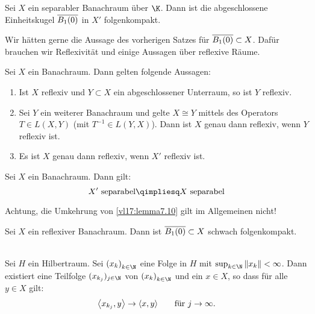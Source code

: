 \begin{thSatz} \label{vl17:satz7.8}
    Sei $X$ ein separabler Banachraum über $\K$. Dann ist die abgeschlossene
    Einheitskugel $\overline{B_1(0)}$ in $X'$ \schwachstern folgenkompakt.
\end{thSatz}


Wir hätten gerne die Aussage des vorherigen Satzes für
$\overline{B_1(0)}\subset X$. Dafür brauchen wir Reflexivität und
einige Aussagen über reflexive Räume.

\begin{thLemma} \label{vl17:lemma7.9}
    Sei $X$ ein Banachraum. Dann gelten folgende Aussagen:
    \begin{enumerate}[(1)]
        \item \label{vl17:lemma7.9:1}
            Ist $X$ reflexiv und $Y\subset X$ ein abgeschlossener Unterraum, so
            ist $Y$ reflexiv.
            
        \item \label{vl17:lemma7.9:2}
            Sei $Y$ ein weiterer Banachraum und gelte $X\cong Y$ mittels des
            Operators $T\in L(X,Y)$ (mit $T^{-1}\in L(Y,X)$). Dann ist $X$ genau
            dann reflexiv, wenn $Y$ reflexiv ist.
            
        \item \label{vl17:lemma7.9:3}
            Es ist $X$ genau dann reflexiv, wenn $X'$ reflexiv ist.
    \end{enumerate}
\end{thLemma}


\begin{thLemma} \label{vl17:lemma7.10}
    Sei $X$ ein Banachraum. Dann gilt:
    \[ X'\text{ separabel} \qimpliesq X\text{ separabel} \]
\end{thLemma}


Achtung, die Umkehrung von \cref{vl17:lemma7.10} gilt im Allgemeinen nicht!

\begin{thSatz} \label{vl17:satz7.11}
    Sei $X$ ein reflexiver Banachraum. Dann ist $\overline{B_1(0)}\subset X$
    schwach folgenkompakt.
\end{thSatz}


\begin{thEmpty}\hfill\\
    \nnSatz
    Sei $H$ ein Hilbertraum. Sei $\kSeq x$ eine Folge in $H$ mit
    $\sup_{k\in\N} \, \norm{x_k} < \infty$. Dann existiert eine Teilfolge
    $(x_{k_j})_{j\in\N}$ von $\kSeq x$ und ein $x\in X$, so dass für alle
    $y\in X$ gilt:
    \[ \SP{ x_{k_j}, y } \to \SP{x,y} \fuer j\to\infty  . \]
\end{thEmpty}


